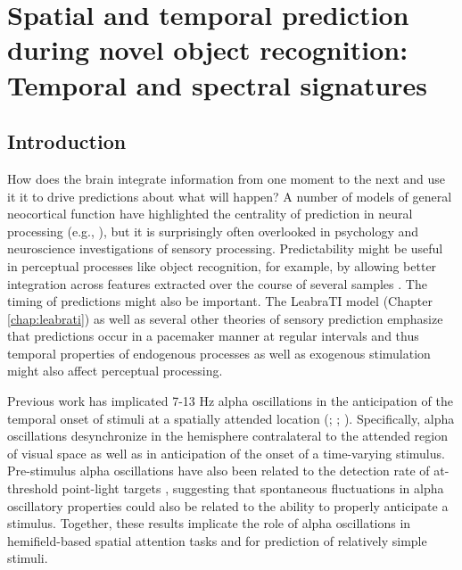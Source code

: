 \documentclass[dwyatte_dissertation.tex]{subfiles}
\begin{document}
\sloppy

\chapter{Spatial and temporal prediction during novel object recognition: Temporal and spectral signatures}
\label{chap:pleast}

\section{Introduction}
How does the brain integrate information from one moment to the next and use it it to drive predictions about what will happen? A number of models of general neocortical function have highlighted the centrality of prediction in neural processing (e.g., ), but it is surprisingly often overlooked in psychology and neuroscience investigations of sensory processing. Predictability might be useful in perceptual processes like object recognition, for example, by allowing better integration across features extracted over the course of several samples \cite{Foldiak91,StringerPerryRollsEtAl06,WallisBaddeley97,IsikLeiboPoggio12}. The timing of predictions might also be important. The LeabraTI model (Chapter \ref{chap:leabrati}) as well as several other theories of sensory prediction \cite{ArnalGiraud12,GiraudPoeppel12} emphasize that predictions occur in a pacemaker manner at regular intervals and thus temporal properties of endogenous processes as well as exogenous stimulation might also affect perceptual processing.

Previous work has implicated 7-13 Hz alpha oscillations in the anticipation of the temporal onset of stimuli at a spatially attended location (; ; ). Specifically, alpha oscillations desynchronize in the hemisphere contralateral to the attended region of visual space as well as in anticipation of the onset of a time-varying stimulus. Pre-stimulus alpha oscillations have also been related to the detection rate of at-threshold point-light targets \cite{MathewsonGrattonFabianiEtAl09,BuschDuboisVanRullen09}, suggesting that spontaneous fluctuations in alpha oscillatory properties could also be related to the ability to properly anticipate a stimulus. Together, these results implicate the role of alpha oscillations in hemifield-based spatial attention tasks and for prediction of relatively simple stimuli. 
\end{document}
